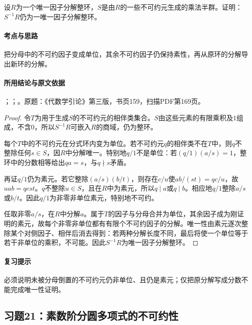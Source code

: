设$R$为一个唯一因子分解整环，$S$是由$R$的一些不可约元生成的乘法半群。证明：$S^{-1}R$仍为一唯一因子分解整环。

\paragraph{考点与思路}

把分母中的不可约因子变成单位，其余不可约因子仍保持素性，再从原环的分解导出新环的分解。

\paragraph{所用结论与原文依据}

；；。原题：《代数学引论》第三版，书页159，扫描PDF第169页。


\begin{proof}

令$T$为用于生成$S$的不可约元的相伴类集合。$S$由这些元素的有限乘积及$1$组成，不含$0$，所以$S^{-1}R$可嵌入$R$的商域，仍为整环。

每个$T$中的不可约元在分式环内变为单位。若不可约元$q$的相伴类不在$T$中，则$q$不整除任何$s\in S$，因$R$中分解唯一。特别地$q/1$不是单位：若$(q/1)(a/s)=1$，整环中的分数相等给出$qa=s$，与$q\nmid s$矛盾。

再证$q/1$仍为素元。若它整除$(a/s)(b/t)$，则存在$c/u$使$ab/(st)=qc/u$，故$uab=q cst$。$q$不整除$u\in S$，且在$R$中为素元，所以$q\mid a$或$q\mid b$。相应地$q/1$整除$a/s$或$b/t$。因此$q/1$为非零非单位素元，特别地不可约。

任取非零$a/s$，在$R$中分解$a$。属于$T$的因子与分母合并为单位，其余因子成为刚证明的素元，故每个非零非单位都有有限个不可约因子的分解。唯一性由素元逐次整除某个对侧因子、相伴后消去得到：若两种分解长度不同，最后将使一个单位等于若干非单位的乘积，不可能。因此$S^{-1}R$为唯一因子分解整环。

\end{proof}

\paragraph{复习提示}

必须说明未被分母倒置的不可约元仍非单位、且仍是素元；仅把原分解写成分数不能完成唯一性证明。

\subsection{习题21：素数阶分圆多项式的不可约性}

